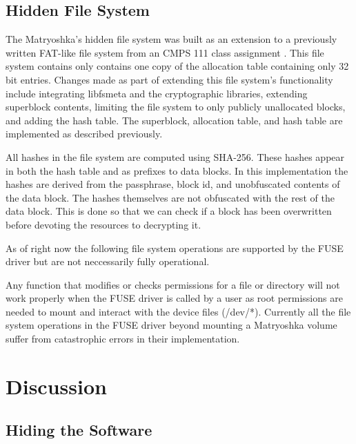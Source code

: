 \documentclass{article}
\begin{document}
\begin{multicols}{2}
\subsection{Hidden File System}
The Matryoshka's hidden file system was built as an extension to a previously written FAT-like file system from an CMPS 111 class assignment \cite{hackfs}. This file system contains only contains one copy of the allocation table containing only 32 bit entries. Changes made as part of extending this file system's functionality include integrating libfsmeta and the cryptographic libraries, extending superblock contents, limiting the file system to only publicly unallocated blocks, and adding the hash table. The superblock, allocation table, and hash table are implemented as described previously.

All hashes in the file system are computed using SHA-256. These hashes appear in both the hash table and as prefixes to data blocks. In this implementation the hashes are derived from the passphrase, block id, and unobfuscated contents of the data block. The hashes themselves are not obfuscated with the rest of the data block. This is done so that we can check if a block has been overwritten before devoting the resources to decrypting it.

As of right now the following file system operations are supported by the FUSE driver but are not neccessarily fully operational.

Any function that modifies or checks permissions for a file or directory will not work properly when the FUSE driver is called by a user as root permissions are needed to mount and interact with the device files (/dev/*).  Currently all the file system operations in the FUSE driver beyond mounting a Matryoshka volume suffer from catastrophic errors in their implementation.

\section{Discussion}


\subsection{Hiding the Software}


\end{multicols}
\end{document}
